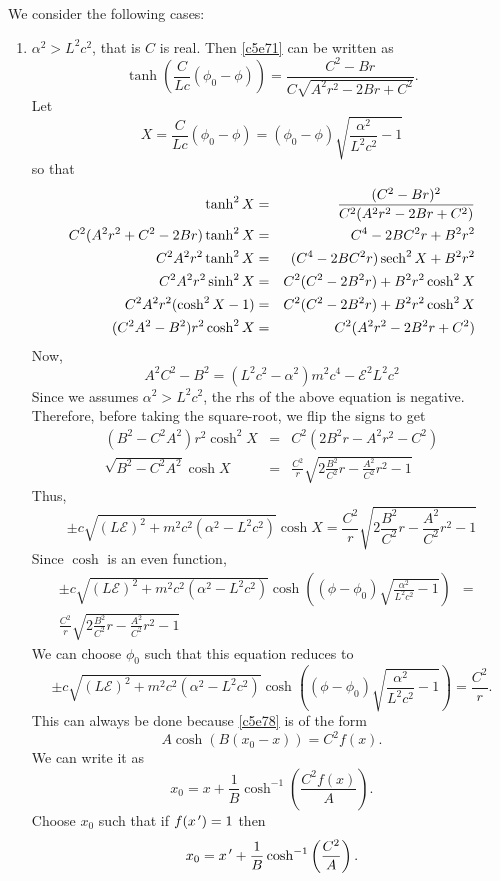 \begin{enumerate}
We consider the following cases:
\begin{enumerate}
\item $\alpha^2 > L^2c^2$, that is $C$ is real. Then \eqref{c5e71} can be 
written as
\[
\tanh\left(\frac{C}{Lc}(\phi_0 - \phi)\right) = \frac{C^2 - Br}{C\sqrt{A^2r^2 
- 2Br + C^2}}.
\]
Let
\begin{equation}\label{c5e77}
X = \frac{C}{Lc}(\phi_0 - \phi) = (\phi_0 - \phi)
\sqrt{\frac{\alpha^2}{L^2c^2} - 1}
\end{equation}
so that
\begin{eqnarray*}
\tanh^2 X &=& \frac{(C^2 - Br)^2}{C^2(A^2r^2 - 2Br + C^2)} \\
C^2(A^2r^2 + C^2 - 2Br)\tanh^2X &=& C^4 - 2BC^2r + B^2r^2 \\
C^2A^2r^2\tanh^2X &=& (C^4 - 2BC^2r)\operatorname{sech}^2X + B^2r^2 \\
C^2A^2r^2\sinh^2X &=& C^2(C^2 - 2B^2r) + B^2r^2\cosh^2X \\
C^2A^2r^2(\cosh^2X - 1) &=& C^2(C^2 - 2B^2r) + B^2r^2\cosh^2X \\
(C^2A^2 - B^2)r^2\cosh^2X &=& C^2(A^2r^2 - 2B^2r + C^2)
\end{eqnarray*}
Now,
\[
A^2C^2-B^2 = (L^2c^2 -\alpha^2)m^2c^4 -\mathcal{E}^2L^2c^2
\]
Since we assumes $\alpha^2 > L^2c^2$, the rhs of the above equation is negative.
Therefore, before taking the square-root, we flip the signs to get
\begin{eqnarray*}
(B^2 - C^2A^2)r^2\cosh^2X &=& C^2(2B^2r - A^2r^2 - C^2) \\
\sqrt{B^2 - C^2A^2}\cosh X &=& \frac{C^2}{r}
\sqrt{2\frac{B^2}{C^2}r - \frac{A^2}{C^2}r^2 - 1}
\end{eqnarray*}
Thus,
\[
\pm c\sqrt{(L\mathcal{E})^2 + m^2c^2(\alpha^2 - L^2c^2)}\cosh X = 
\frac{C^2}{r}\sqrt{2\frac{B^2}{C^2}r - \frac{A^2}{C^2}r^2 - 1}
\]
Since $\cosh$ is an even function,
\begin{eqnarray}
\pm c\sqrt{(L\mathcal{E})^2 + m^2c^2(\alpha^2 - L^2c^2)}
\cosh\left((\phi - \phi_0)\sqrt{\frac{\alpha^2}{L^2c^2} - 1}\right) &=& 
\nonumber\\
\frac{C^2}{r}\sqrt{2\frac{B^2}{C^2}r - \frac{A^2}{C^2}r^2 - 1} \label{c5e78}
\end{eqnarray}
We can choose $\phi_0$ such that this equation reduces to
\begin{equation}\label{c5e79}
\pm c\sqrt{(L\mathcal{E})^2 + m^2c^2(\alpha^2 - L^2c^2)}
\cosh\left((\phi - \phi_0)\sqrt{\frac{\alpha^2}{L^2c^2} - 1}\right) = 
\frac{C^2}{r}.
\end{equation}
This can always be done because \eqref{c5e78} is of the form
\begin{equation}\label{c5e80}
A\cosh(B(x_0-x)) = C^2f(x).
\end{equation}
We can write it as
\begin{equation}\label{c5e81}
x_0 = x + \frac{1}{B}\cosh^{-1}\left(\frac{C^2f(x)}{A}\right).
\end{equation}
Choose $x_0$ such that if $f(x^{\,\prime}) = 1$ then
\begin{equation}\label{c5e82}
x_0 = x^{\,\prime} + \frac{1}{B}\cosh^{-1}\left(\frac{C^2}{A}\right).
\end{equation}


\end{enumerate}
\end{enumerate}
